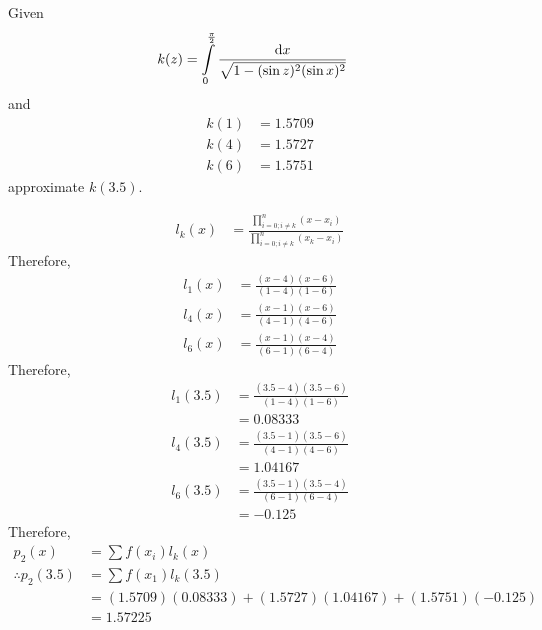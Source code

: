 \documentclass[fleqn, a4paper, 12pt, twoside, titlepage]{article}
\theoremstyle{definition}
\theoremstyle{theorem}
\begin{document}
\begin{question}
	Given
	\begin{align*}
		k(z) & = \int\limits_{0}^{\frac{\pi}{2}} \frac{\dif x}{\sqrt{1 - (\sin z)^2 (\sin x)^2}}
	\end{align*}
	and
	\begin{align*}
		k(1) & = 1.5709 \\
		k(4) & = 1.5727 \\
		k(6) & = 1.5751
	\end{align*}
	approximate $k(3.5)$.
\end{question}

\begin{solution}
	\begin{align*}
		l_k(x) & = \frac{\prod\limits_{i = 0 ; i \neq k}^{n} (x - x_i)}{\prod\limits_{i = 0 ; i \neq k}^{n} (x_k - x_i)}
	\end{align*}
	Therefore,
	\begin{align*}
		l_1(x) & = \frac{(x - 4) (x - 6)}{(1 - 4) (1 - 6)} \\
		l_4(x) & = \frac{(x - 1) (x - 6)}{(4 - 1) (4 - 6)} \\
		l_6(x) & = \frac{(x - 1) (x - 4)}{(6 - 1) (6 - 4)}
	\end{align*}
	Therefore,
	\begin{align*}
		l_1(3.5) & = \frac{(3.5 - 4) (3.5 - 6)}{(1 - 4) (1 - 6)} \\
                         & = 0.08333                                     \\
		l_4(3.5) & = \frac{(3.5 - 1) (3.5 - 6)}{(4 - 1) (4 - 6)} \\
                         & = 1.04167                                     \\
		l_6(3.5) & = \frac{(3.5 - 1) (3.5 - 4)}{(6 - 1) (6 - 4)} \\
                         & = -0.125
	\end{align*}
	Therefore,
	\begin{align*}
		p_2(x)              & = \sum f(x_i) l_k(x)                                          \\
		\therefore p_2(3.5) & = \sum f(x_1) l_k(3.5)                                        \\
                                    & = (1.5709) (0.08333) + (1.5727) (1.04167) + (1.5751) (-0.125) \\
                                    & = 1.57225
	\end{align*}
\end{solution}
\end{document}
